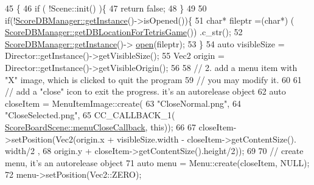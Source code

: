\begin{DoxyCode}
45                                    \{
46                     \textcolor{keywordflow}{if} ( !Scene::init() )\{
47                         \textcolor{keywordflow}{return} \textcolor{keyword}{false};
48                     \}
49                     
50                     \textcolor{keywordflow}{if}(!\hyperlink{class_tetris_1_1_d_b_management_1_1_d_b_manager_a9cb81505055490211a9b5c79c3c22c18}{ScoreDBManager::getInstance}()->isOpened())\{
51                         \textcolor{keywordtype}{char}* fileptr =(\textcolor{keywordtype}{char}*) (
      \hyperlink{class_tetris_1_1_d_b_management_1_1_d_b_manager_ae50cfd222e276a5ca27e17c886aa5dd5}{ScoreDBManager::getDBLocationForTetrisGame}()) .c\_str();
52                         \hyperlink{class_tetris_1_1_d_b_management_1_1_d_b_manager_a9cb81505055490211a9b5c79c3c22c18}{ScoreDBManager::getInstance}()->
      \hyperlink{class_tetris_1_1_d_b_management_1_1_d_b_manager_a8bf7e756a9cca7e57fef00076fb62f36}{open}(fileptr);
53                     \}
54                     \textcolor{keyword}{auto} visibleSize = Director::getInstance()->getVisibleSize();
55                     Vec2 origin = Director::getInstance()->getVisibleOrigin();
56                     
58                     \textcolor{comment}{// 2. add a menu item with "X" image, which is clicked to quit the program}
59                     \textcolor{comment}{//    you may modify it.}
60                     
61                     \textcolor{comment}{// add a "close" icon to exit the progress. it's an autorelease object}
62                     \textcolor{keyword}{auto} closeItem = MenuItemImage::create(
63                                                            \textcolor{stringliteral}{"CloseNormal.png"},
64                                                            \textcolor{stringliteral}{"CloseSelected.png"},
65                                                            CC\_CALLBACK\_1(
      \hyperlink{class_tetris_1_1_cocos2d_scenes_1_1_score_board_scene_ad17f53b26718969718fed03b2b38ff61}{ScoreBoardScene::menuCloseCallback}, \textcolor{keyword}{this}));
66                     
67                     closeItem->setPosition(Vec2(origin.x + visibleSize.width - closeItem->getContentSize().
      width/2 ,
68                                                 origin.y + closeItem->getContentSize().height/2));
69                     
70                     \textcolor{comment}{// create menu, it's an autorelease object}
71                     \textcolor{keyword}{auto} menu = Menu::create(closeItem, NULL);
72                     menu->setPosition(Vec2::ZERO);

\end{DoxyCode}
